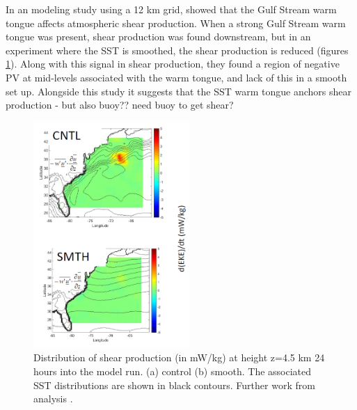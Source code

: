 
In an modeling study using a 12 km grid, \citet{sheldon2017warm} showed that the Gulf Stream warm tongue affects atmospheric shear production.  When a strong Gulf Stream warm tongue was present, shear production was found downstream, but in an experiment where the SST is smoothed, the shear production is reduced (figures \ref{fig:Sheldon}). Along with this signal in shear production, they found a region of negative PV at mid-levels associated with the warm tongue, and lack of this in a smooth set up. Alongside this study it suggests that the SST warm tongue anchors shear production - but also buoy?? need buoy to get shear?

\begin{figure}[h]
	\centering
	\includegraphics[width=14pc]{Arnaud_plot.PNG}
	\caption{Distribution of shear production (in mW/kg) at height z=4.5 km 24 hours into the model run. (a) control (b) smooth. The associated SST distributions are shown in black contours. Further work from analysis \citet{sheldon2017warm}.}
	\label{fig:Sheldon} 
\end{figure}

